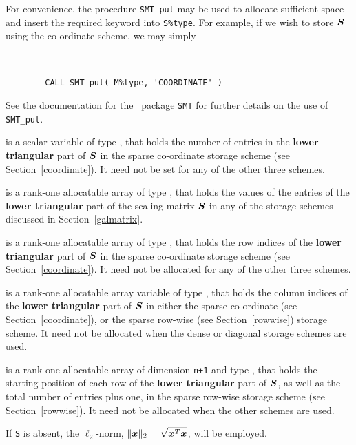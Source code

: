\documentclass{galahad}
\begin{document}
\begin{description}
\begin{description}
For convenience, the procedure {\tt SMT\_put}
may be used to allocate sufficient space and insert the required keyword
into {\tt S\%type}.
For example, if we wish to store ${\bm{S}}$ using the co-ordinate scheme,
we may simply
{\tt
\begin{verbatim}
        CALL SMT_put( M%type, 'COORDINATE' )
\end{verbatim}
}
\noindent
See the documentation for the \galahad\ package {\tt SMT}
for further details on the use of {\tt SMT\_put}.

 is a scalar variable of type \integer, that
holds the number of entries in the {\bf lower triangular} part of ${\bm{S}}$
in the sparse co-ordinate storage scheme (see Section~\ref{coordinate}).
It need not be set for any of the other three schemes.

 is a rank-one allocatable array of type \realdp, that holds
the values of the entries of the {\bf lower triangular} part
of the scaling matrix ${\bm{S}}$ in any of the
storage schemes discussed in Section~\ref{galmatrix}.

 is a rank-one allocatable array of type \integer,
that holds the row indices of the {\bf lower triangular} part of ${\bm{S}}$
in the sparse co-ordinate storage
scheme (see Section~\ref{coordinate}).
It need not be allocated for any of the other three schemes.

 is a rank-one allocatable array variable of type \integer,
that holds the column indices of the {\bf lower triangular} part of
${\bm{S}}$ in either the sparse co-ordinate
(see Section~\ref{coordinate}), or the sparse row-wise
(see Section~\ref{rowwise}) storage scheme.
It need not be allocated when the dense or diagonal storage schemes are used.

 is a rank-one allocatable array of dimension {\tt n+1} and type
\integer, that holds the starting position of
each row of the {\bf lower triangular} part of ${\bm{S}}$, as well
as the total number of entries plus one, in the sparse row-wise storage
scheme (see Section~\ref{rowwise}). It need not be allocated when the
other schemes are used.

\end{description}
If {\tt S} is absent, the $\ell_2$-norm, $\|{\bm{x}}\|_2 = \sqrt{{\bm{x}}^T {\bm{x}}}$,
will be employed.

\end{description}
\end{document}
